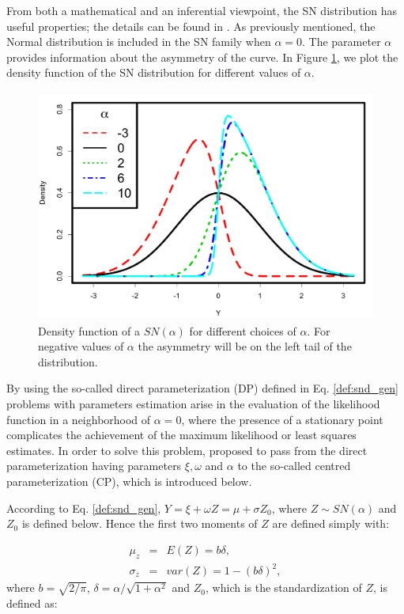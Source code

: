 \documentclass[11pt, oneside]{article}
\begin{document}
From both a mathematical and an inferential viewpoint, the SN distribution has useful properties; the details can be found in \citet{Azzalini1985}. As previously mentioned, the Normal distribution is included in the SN family when $\alpha=0$. The parameter $\alpha$ provides information about the asymmetry of the curve. In Figure \ref{fig:SN.plot}, we plot the density function of the SN distribution for different values of $\alpha$.

\begin{figure}[htbp]
   \centering
\includegraphics[height = 3in]{Skew_normal_densities_jjck.pdf} 
   \caption{Density function of a $SN(\alpha)$ for different choices of $\alpha$. For negative values of $\alpha$ the asymmetry will be on the left tail of the distribution.}
   \label{fig:SN.plot}
\end{figure}

By using the so-called direct parameterization (DP) defined in Eq. \ref{def:snd_gen} problems with parameters estimation arise in the evaluation of the likelihood function in a neighborhood of $\alpha=0$, where the presence of a stationary point complicates the achievement of the maximum likelihood or least squares estimates. In order to solve this problem, \citet{Azzalini1985} proposed to pass from the direct parameterization having parameters $\xi, \omega$ and $\alpha$ to the so-called centred parameterization (CP), which is introduced below. 

According to Eq. \ref{def:snd_gen}, $Y = \xi + \omega Z = \mu + \sigma Z_{0} $, where $Z \sim SN(\alpha)$ and $Z_{0}$ is defined below. Hence the first two moments of $Z$ are defined simply with:

\begin{eqnarray}
\mu_{z} &=& E(Z) = b\delta, \nonumber\\
\sigma_{z} &=& var(Z) = 1-(b\delta)^2,\nonumber
\end{eqnarray}
where $b=\sqrt{2/\pi}$, $\delta = \alpha / \sqrt{1+\alpha^{2}}$ and $Z_{0}$, which is the standardization of $Z$, is defined as:
 
\end{document}
